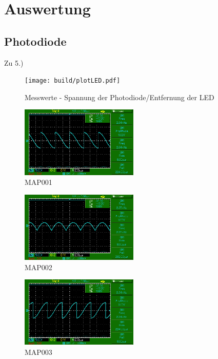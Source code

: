 \newpage
\section{Auswertung}
\label{sec:Auswertung}
\subsection{Photodiode}
Zu 5.)\\

\begin{figure}
    \centering
    \texttt{[image: build/plotLED.pdf]}
    \caption{Messwerte - Spannung der Photodiode/Entfernung der LED}        
    \label{fig:plotLED}
\end{figure}

\begin{figure}
    \centering
    \includegraphics[width=0.5\textwidth]{bilder/MAP001.png}
    \caption{MAP001}        
    \label{fig:MAP001}
\end{figure}

\begin{figure}
    \centering
    \includegraphics[width=0.5\textwidth]{bilder/MAP002.png}
    \caption{MAP002}        
    \label{fig:MAP002}
\end{figure}

\begin{figure}
    \centering
    \includegraphics[width=0.5\textwidth]{bilder/MAP003.png}
    \caption{MAP003}        
    \label{fig:MAP003}
\end{figure}

